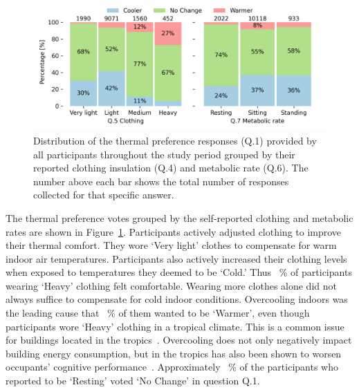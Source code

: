\begin{figure}[thb!]
    \begin{center}
        \includegraphics[width=\linewidth,height=\textheight,keepaspectratio]{figures/figure_7}
    \end{center}
    \caption{Distribution of the thermal preference responses (Q.1) provided by all participants throughout the study period grouped by their reported clothing insulation (Q.4) and metabolic rate (Q.6).
    The number above each bar shows the total number of responses collected for that specific answer.}\label{fig:tpv_by_cat}
\end{figure}

The thermal preference votes grouped by the self-reported clothing and metabolic rates are shown in Figure~\ref{fig:tpv_by_cat}.
Participants actively adjusted clothing to improve their thermal comfort.
They wore `Very light' clothes to compensate for warm indoor air temperatures.
Participants also actively increased their clothing levels when exposed to temperatures they deemed to be `Cold.'
Thus ~\% of participants wearing `Heavy' clothing felt comfortable.
Wearing more clothes alone did not always suffice to compensate for cold indoor conditions.
Overcooling indoors was the leading cause that ~\% of them wanted to be `Warmer', even though participants wore `Heavy' clothing in a tropical climate.
This is a common issue for buildings located in the tropics~\cite{Sekhar2016}.
Overcooling does not only negatively impact building energy consumption, but in the tropics has also been shown to worsen occupants' cognitive performance~\cite{Schiavon2016}.
Approximately ~\% of the participants who reported to be `Resting' voted `No Change' in question Q.1.

